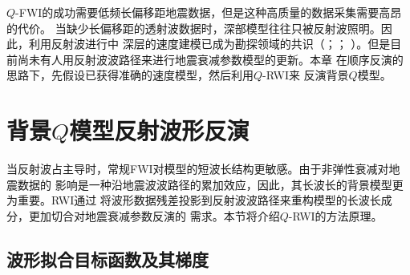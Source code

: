 $Q$-FWI的成功需要低频长偏移距地震数据，但是这种高质量的数据采集需要高昂的代价。
当缺少长偏移距的透射波数据时，深部模型往往只被反射波照明。因此，利用反射波进行中
深层的速度建模已成为勘探领域的共识（；；
）。但是目前尚未有人用反射波波路径来进行地震衰减参数模型的更新。本章
在顺序反演的思路下，先假设已获得准确的速度模型，然后利用$Q$-RWI来
反演背景$Q$模型。

\vspace{0.7cm}
\section{背景$Q$模型反射波形反演}
\vspace{0.8cm}

当反射波占主导时，常规FWI对模型的短波长结构更敏感。由于非弹性衰减对地震数据的
影响是一种沿地震波波路径的累加效应，因此，其长波长的背景模型更为重要。RWI通过
将波形数据残差投影到反射波波路径来重构模型的长波长成分，更加切合对地震衰减参数反演的
需求。本节将介绍$Q$-RWI的方法原理。

\vspace{0.7cm}
\subsection{波形拟合目标函数及其梯度}
\vspace{0.8cm}

